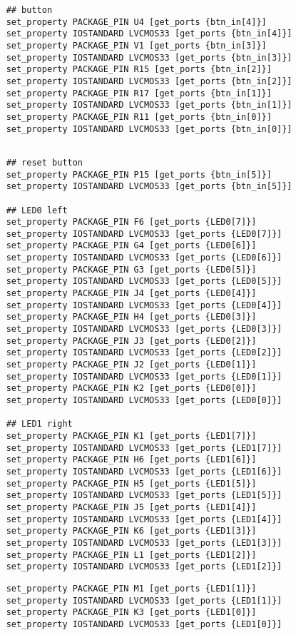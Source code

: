 {\begin{spacing}{1.5}
\begin{lstlisting}
	## button
	set_property PACKAGE_PIN U4 [get_ports {btn_in[4]}]
	set_property IOSTANDARD LVCMOS33 [get_ports {btn_in[4]}]
	set_property PACKAGE_PIN V1 [get_ports {btn_in[3]}]
	set_property IOSTANDARD LVCMOS33 [get_ports {btn_in[3]}]
	set_property PACKAGE_PIN R15 [get_ports {btn_in[2]}]
	set_property IOSTANDARD LVCMOS33 [get_ports {btn_in[2]}]
	set_property PACKAGE_PIN R17 [get_ports {btn_in[1]}]
	set_property IOSTANDARD LVCMOS33 [get_ports {btn_in[1]}]
	set_property PACKAGE_PIN R11 [get_ports {btn_in[0]}]
	set_property IOSTANDARD LVCMOS33 [get_ports {btn_in[0]}]
	\end{lstlisting}
	\begin{lstlisting}
	
	## reset button
	set_property PACKAGE_PIN P15 [get_ports {btn_in[5]}]
	set_property IOSTANDARD LVCMOS33 [get_ports {btn_in[5]}]
	
	## LED0 left
	set_property PACKAGE_PIN F6 [get_ports {LED0[7]}]
	set_property IOSTANDARD LVCMOS33 [get_ports {LED0[7]}]
	set_property PACKAGE_PIN G4 [get_ports {LED0[6]}]
	set_property IOSTANDARD LVCMOS33 [get_ports {LED0[6]}]
	set_property PACKAGE_PIN G3 [get_ports {LED0[5]}]
	set_property IOSTANDARD LVCMOS33 [get_ports {LED0[5]}]
	set_property PACKAGE_PIN J4 [get_ports {LED0[4]}]
	set_property IOSTANDARD LVCMOS33 [get_ports {LED0[4]}]
	set_property PACKAGE_PIN H4 [get_ports {LED0[3]}]
	set_property IOSTANDARD LVCMOS33 [get_ports {LED0[3]}]
	set_property PACKAGE_PIN J3 [get_ports {LED0[2]}]
	set_property IOSTANDARD LVCMOS33 [get_ports {LED0[2]}]
	set_property PACKAGE_PIN J2 [get_ports {LED0[1]}]
	set_property IOSTANDARD LVCMOS33 [get_ports {LED0[1]}]
	set_property PACKAGE_PIN K2 [get_ports {LED0[0]}]
	set_property IOSTANDARD LVCMOS33 [get_ports {LED0[0]}]
	
	## LED1 right
	set_property PACKAGE_PIN K1 [get_ports {LED1[7]}]
	set_property IOSTANDARD LVCMOS33 [get_ports {LED1[7]}]
	set_property PACKAGE_PIN H6 [get_ports {LED1[6]}]
	set_property IOSTANDARD LVCMOS33 [get_ports {LED1[6]}]
	set_property PACKAGE_PIN H5 [get_ports {LED1[5]}]
	set_property IOSTANDARD LVCMOS33 [get_ports {LED1[5]}]
	set_property PACKAGE_PIN J5 [get_ports {LED1[4]}]
	set_property IOSTANDARD LVCMOS33 [get_ports {LED1[4]}]
	set_property PACKAGE_PIN K6 [get_ports {LED1[3]}]
	set_property IOSTANDARD LVCMOS33 [get_ports {LED1[3]}]
	set_property PACKAGE_PIN L1 [get_ports {LED1[2]}]
	set_property IOSTANDARD LVCMOS33 [get_ports {LED1[2]}]
	\end{lstlisting}
	\begin{lstlisting}
	set_property PACKAGE_PIN M1 [get_ports {LED1[1]}]
	set_property IOSTANDARD LVCMOS33 [get_ports {LED1[1]}]
	set_property PACKAGE_PIN K3 [get_ports {LED1[0]}]
	set_property IOSTANDARD LVCMOS33 [get_ports {LED1[0]}]
	

\end{lstlisting}
\end{spacing}}
